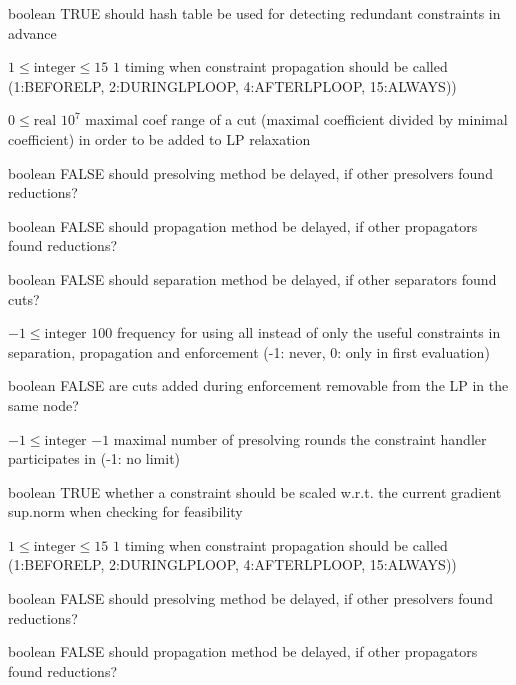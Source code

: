 %
{boolean}%
{TRUE}%
{should hash table be used for detecting redundant constraints in advance}%
{}

%
{$1\leq\textrm{integer}\leq15$}%
{$1$}%
{timing when constraint propagation should be called (1:BEFORELP, 2:DURINGLPLOOP, 4:AFTERLPLOOP, 15:ALWAYS))}%
{}

%
{$0\leq\textrm{real}$}%
{$10^{  7}$}%
{maximal coef range of a cut (maximal coefficient divided by minimal coefficient) in order to be added to LP relaxation}%
{}

%
{boolean}%
{FALSE}%
{should presolving method be delayed, if other presolvers found reductions?}%
{}

%
{boolean}%
{FALSE}%
{should propagation method be delayed, if other propagators found reductions?}%
{}

%
{boolean}%
{FALSE}%
{should separation method be delayed, if other separators found cuts?}%
{}

%
{$-1\leq\textrm{integer}$}%
{$100$}%
{frequency for using all instead of only the useful constraints in separation, propagation and enforcement (-1: never, 0: only in first evaluation)}%
{}

%
{boolean}%
{FALSE}%
{are cuts added during enforcement removable from the LP in the same node?}%
{}

%
{$-1\leq\textrm{integer}$}%
{$-1$}%
{maximal number of presolving rounds the constraint handler participates in (-1: no limit)}%
{}

%
{boolean}%
{TRUE}%
{whether a constraint should be scaled w.r.t. the current gradient sup.norm when checking for feasibility}%
{}

%
{$1\leq\textrm{integer}\leq15$}%
{$1$}%
{timing when constraint propagation should be called (1:BEFORELP, 2:DURINGLPLOOP, 4:AFTERLPLOOP, 15:ALWAYS))}%
{}

%
{boolean}%
{FALSE}%
{should presolving method be delayed, if other presolvers found reductions?}%
{}

%
{boolean}%
{FALSE}%
{should propagation method be delayed, if other propagators found reductions?}%
{}

